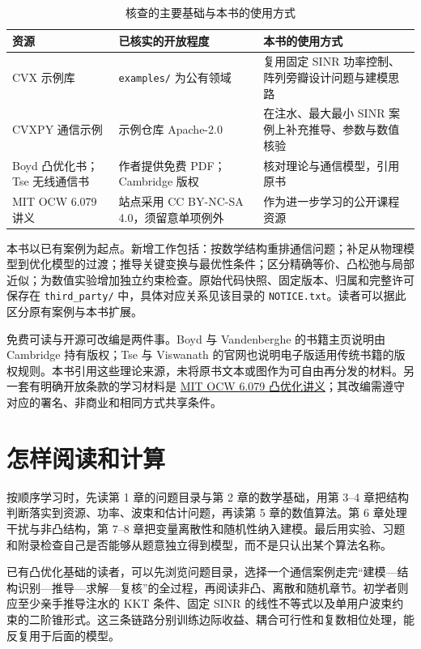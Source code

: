 \begin{table}[htbp]
\centering\small
\caption{核查的主要基础与本书的使用方式}
\begin{tabularx}{\textwidth}{@{}p{}p{}X@{}}
\toprule
资源 & 已核实的开放程度 & 本书的使用方式\\
\midrule
CVX 示例库 & \texttt{examples/} 为公有领域 & 复用固定 SINR 功率控制、阵列旁瓣设计问题与建模思路\\
CVXPY 通信示例 & 示例仓库 Apache-2.0 & 在注水、最大最小 SINR 案例上补充推导、参数与数值核验\\
Boyd 凸优化书；Tse 无线通信书 & 作者提供免费 PDF；Cambridge 版权 & 核对理论与通信模型，引用原书\\
MIT OCW 6.079 讲义 & 站点采用 CC BY-NC-SA 4.0，须留意单项例外 & 作为进一步学习的公开课程资源\\
\bottomrule
\end{tabularx}
\end{table}

本书以已有案例为起点\cite{cvxexamples,cvxpyexamples}。新增工作包括：按数学结构重排通信问题；补足从物理模型到优化模型的过渡；推导关键变换与最优性条件；区分精确等价、凸松弛与局部近似；为数值实验增加独立约束检查。原始代码快照、固定版本、归属和完整许可保存在 \texttt{third\_party/} 中，具体对应关系见该目录的 \texttt{NOTICE.txt}。读者可以据此区分原有案例与本书扩展。

免费可读与开源可改编是两件事。Boyd 与 Vandenberghe 的书籍主页说明由 Cambridge 持有版权\cite{boyd2004}；Tse 与 Viswanath 的官网也说明电子版适用传统书籍的版权规则\cite{tse2005}。本书引用这些理论来源，未将原书文本或图作为可自由再分发的材料。另一套有明确开放条款的学习材料是 \href{https://ocw.mit.edu/courses/6-079-introduction-to-convex-optimization-fall-2009/pages/lecture-notes/}{MIT OCW 6.079 凸优化讲义}；其改编需遵守对应的署名、非商业和相同方式共享条件。

\section*{怎样阅读和计算}

按顺序学习时，先读第 1 章的问题目录与第 2 章的数学基础，用第 3--4 章把结构判断落实到资源、功率、波束和估计问题，再读第 5 章的数值算法。第 6 章处理干扰与非凸结构，第 7--8 章把变量离散性和随机性纳入建模。最后用实验、习题和附录检查自己是否能够从题意独立得到模型，而不是只认出某个算法名称。

已有凸优化基础的读者，可以先浏览问题目录，选择一个通信案例走完“建模—结构识别—推导—求解—复核”的全过程，再阅读非凸、离散和随机章节。初学者则应至少亲手推导注水的 KKT 条件、固定 SINR 的线性不等式以及单用户波束约束的二阶锥形式。这三条链路分别训练边际收益、耦合可行性和复数相位处理，能反复用于后面的模型。

